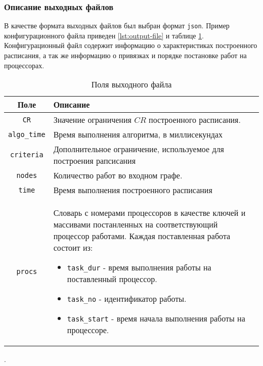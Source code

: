 \subsubsection{Описание выходных файлов}
В качестве формата выходных файлов был выбран формат \texttt{json}. Пример конфигурационного файла приведен \ref{lst:output-file} и таблице \ref{tbl:output-file-fields}. Конфигурационный файл содержит информацию о характеристиках построенного расписания, а так же информацию о привязках и порядке постановке работ на процессорах.
\begin{table}[!htbp]
    \centering
    \begin{tabularx}{\textwidth}{|c|X|}
        \hline
        Поле                & Описание                                                                                                                                                \\
        \hline
        \texttt{CR}         & Значение ограничения $CR$ построенного расписания.                                                                                                      \\
        \hline
        \texttt{algo\_time} & Время выполнения алгоритма, в миллисекундах                                                                                                             \\
        \hline
        \texttt{criteria}   & Дополнительное ограничение, используемое для построения рапсисания                                                                                      \\
        \hline
        \texttt{nodes}      & Количество работ во входном графе.                                                                                                                      \\
        \hline
        \texttt{time}       & Время выполнения построенного расписания                                                                                                                \\
        \hline
        \texttt{procs}      & Словарь с номерами процессоров в качестве ключей и массивами постанленных на соответствующий процессор работами. Каждая поставленная работа состоит из:
        \begin{itemize}
            \item \texttt{task\_dur} - время выполнения работы на поставленный процессор.
            \item \texttt{task\_no} - идентификатор работы.
            \item \texttt{task\_start} - время начала выполнения работы на процессоре.
        \end{itemize}                                                                                                  \\
        \hline
    \end{tabularx}
    \caption{Поля выходного файла}.
    \label{tbl:output-file-fields}
\end{table}

